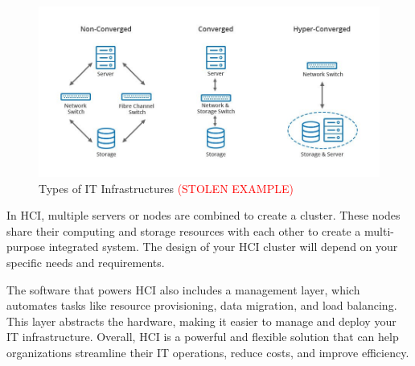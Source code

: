 \begin{figure}[H]
    \centering
    \includegraphics[scale = 0.5]{images/HCI_tldr.jpg}
    \caption{Types of IT Infrastructures \textcolor{red}{(STOLEN EXAMPLE)}}
    \label{HCI Convergance Comparison}
\end{figure}

In HCI, multiple servers or nodes are combined to create a cluster. These nodes share their computing and storage resources with each other to create a multi-purpose integrated system. The design of your HCI cluster will depend on your specific needs and requirements.

The software that powers HCI also includes a management layer, which automates tasks like resource provisioning, data migration, and load balancing. This layer abstracts the hardware, making it easier to manage and deploy your IT infrastructure. Overall, HCI is a powerful and flexible solution that can help organizations streamline their IT operations, reduce costs, and improve efficiency.

